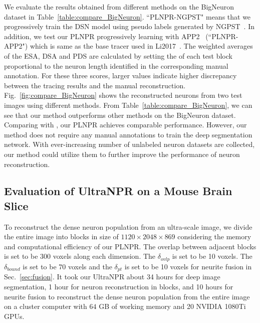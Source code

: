 We evaluate the results obtained from different methods on the BigNeuron dataset in Table~\ref{table:compare_BigNeuron}.
``PLNPR-NGPST" means that we progressively train the DSN model using pseudo labels generated by NGPST~\cite{Quan2015}. In addition, we test our PLNPR progressively learning with APP2~\cite{Xiao2013} (``PLNPR-APP2") which is same as the base tracer used in Li2017~\cite{Li2017}.
%
The weighted averages of the ESA, DSA and PDS are calculated by setting the of each test block proportional to the neuron length identified in the corresponding manual annotation.
For these three scores, larger values indicate higher discrepancy between the tracing results and the manual reconstruction.
%
Fig.~\ref{fig:compare_BigNeuron} shows the reconstructed neurons from two test images using different methods.
%
From Table~\ref{table:compare_BigNeuron}, we can see that our method outperforms other methods on the BigNeuron dataset.
%
Comparing with \cite{Li2017}, our PLNPR achieves comparable performance.
%
However, our method does not require any manual annotations to train the deep segmentation network.
With ever-increasing number of unlabeled neuron datasets are collected, our method could utilize them to further improve the performance of neuron reconstruction.




\subsection{Evaluation of UltraNPR on a Mouse Brain Slice}
\label{sec:exp_UltraNPR}

To reconstruct the dense neuron population from an ultra-scale image, we divide the entire image into blocks in size of $1120\times 2048\times 869$ considering the memory and computational efficiency of our PLNPR.
%
The overlap between adjacent blocks is set to be $300$ voxels along each dimension. 
The $\delta_{ovlp}$ is set to be 10 voxels.
The $\delta_{bound}$ is set to be 70 voxels and the $\delta_{pt}$ is set to be 10 voxels for neurite fusion in Sec.~\ref{sec:fusion}.
%
It took our UltraNPR about 34 hours for deep image segmentation, 1 hour for neuron reconstruction in blocks, and 10 hours for neurite fusion to reconstruct the dense neuron population from the entire image on a cluster computer with $64$ GB of working memory and 20 NVIDIA 1080Ti GPUs.


